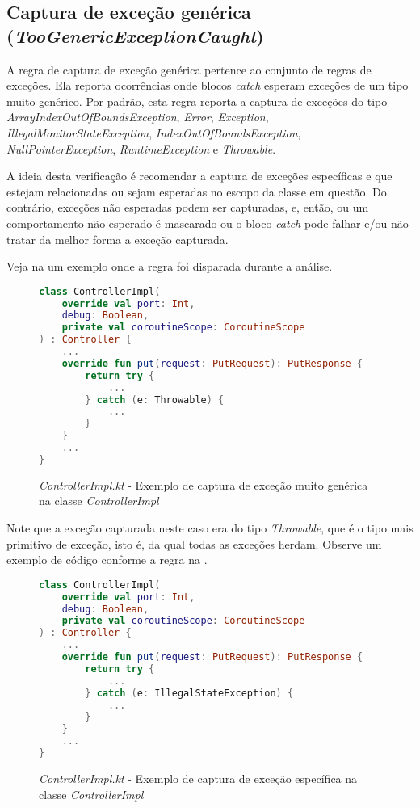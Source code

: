 \subsection{Captura de exceção genérica (\textit{TooGenericExceptionCaught})}

A regra de captura de exceção genérica pertence ao conjunto de regras de exceções. Ela reporta ocorrências onde blocos \textit{catch} esperam exceções de um tipo muito genérico. Por padrão, esta regra reporta a captura de exceções do tipo \textit{ArrayIndexOutOfBoundsException}, \textit{Error}, \textit{Exception}, \textit{IllegalMonitorStateException}, \textit{IndexOutOfBoundsException}, \textit{NullPointerException}, \textit{RuntimeException} e \textit{Throwable}.

A ideia desta verificação é recomendar a captura de exceções específicas e que estejam relacionadas ou sejam esperadas no escopo da classe em questão\cite{detekt_too_generic_exception_caught_rule}. Do contrário, exceções não esperadas podem ser capturadas, e, então, ou um comportamento não esperado é mascarado ou o bloco \textit{catch} pode falhar e/ou não tratar da melhor forma a exceção capturada.

Veja na  um exemplo onde a regra foi disparada durante a análise.

\begin{figure}[H]
    \centering
    \begin{lstlisting}[language=Kotlin]
class ControllerImpl(
    override val port: Int,
    debug: Boolean,
    private val coroutineScope: CoroutineScope
) : Controller {
    ...
    override fun put(request: PutRequest): PutResponse {
        return try {
            ...
        } catch (e: Throwable) {
            ...
        }
    }
    ...
}
    \end{lstlisting}
    \caption{\textit{ControllerImpl.kt} - Exemplo de captura de exceção muito genérica na classe \textit{ControllerImpl}}
    \label{fig:detekt_too_generic_exception_before_example}
\end{figure}

Note que a exceção capturada neste caso era do tipo \textit{Throwable}, que é o tipo mais primitivo de exceção, isto é, da qual todas as exceções herdam. Observe um exemplo de código conforme a regra na .

\begin{figure}[H]
    \centering
    \begin{lstlisting}[language=Kotlin]
class ControllerImpl(
    override val port: Int,
    debug: Boolean,
    private val coroutineScope: CoroutineScope
) : Controller {
    ...
    override fun put(request: PutRequest): PutResponse {
        return try {
            ...
        } catch (e: IllegalStateException) {
            ...
        }
    }
    ...
}
    \end{lstlisting}
    \caption{\textit{ControllerImpl.kt} - Exemplo de captura de exceção específica na classe \textit{ControllerImpl}}
    \label{fig:detekt_too_generic_exception_after_example}
\end{figure}

